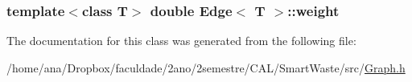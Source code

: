 \subsubsection[{\texorpdfstring{weight}{weight}}]{\setlength{\rightskip}{0pt plus 5cm}template$<$class T$>$ double {\bf Edge}$<$ T $>$\+::weight\hspace{0.3cm}{\ttfamily [private]}}\hypertarget{classEdge_af188b57b604f0d65e2da48733bd76426}{}\label{classEdge_af188b57b604f0d65e2da48733bd76426}


The documentation for this class was generated from the following file\+:\begin{DoxyCompactItemize}
\item 
/home/ana/\+Dropbox/faculdade/2ano/2semestre/\+C\+A\+L/\+Smart\+Waste/src/\hyperlink{Graph_8h}{Graph.\+h}\end{DoxyCompactItemize}
